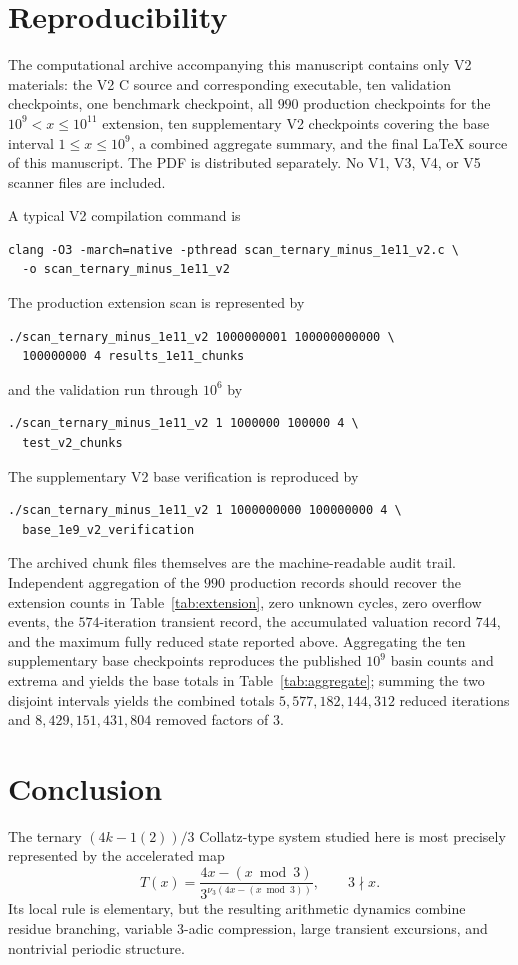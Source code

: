 \documentclass[11pt]{article}
\newcommand{\vthree}{\nu_3}
\newcommand{\Tmap}{T}
\begin{document}
\section{Reproducibility}
The computational archive accompanying this manuscript contains only V2 materials: the V2 C source and corresponding executable, ten validation checkpoints, one benchmark checkpoint, all $990$ production checkpoints for the $10^9<x\le10^{11}$ extension, ten supplementary V2 checkpoints covering the base interval $1\le x\le10^9$, a combined aggregate summary, and the final LaTeX source of this manuscript.  The PDF is distributed separately.  No V1, V3, V4, or V5 scanner files are included.

A typical V2 compilation command is
\begin{verbatim}
clang -O3 -march=native -pthread scan_ternary_minus_1e11_v2.c \
  -o scan_ternary_minus_1e11_v2
\end{verbatim}
The production extension scan is represented by
\begin{verbatim}
./scan_ternary_minus_1e11_v2 1000000001 100000000000 \
  100000000 4 results_1e11_chunks
\end{verbatim}
and the validation run through $10^6$ by
\begin{verbatim}
./scan_ternary_minus_1e11_v2 1 1000000 100000 4 \
  test_v2_chunks
\end{verbatim}
The supplementary V2 base verification is reproduced by
\begin{verbatim}
./scan_ternary_minus_1e11_v2 1 1000000000 100000000 4 \
  base_1e9_v2_verification
\end{verbatim}

The archived chunk files themselves are the machine-readable audit trail.  Independent aggregation of the $990$ production records should recover the extension counts in Table~\ref{tab:extension}, zero unknown cycles, zero overflow events, the $574$-iteration transient record, the accumulated valuation record $744$, and the maximum fully reduced state reported above.  Aggregating the ten supplementary base checkpoints reproduces the published $10^9$ basin counts and extrema and yields the base totals in Table~\ref{tab:aggregate}; summing the two disjoint intervals yields the combined totals $5,577,182,144,312$ reduced iterations and $8,429,151,431,804$ removed factors of $3$.

\section{Conclusion}
The ternary $(4k-1(2))/3$ Collatz-type system studied here is most precisely represented by the accelerated map
\[
\Tmap(x)=\frac{4x-(x\bmod3)}{3^{\vthree(4x-(x\bmod3))}},
\qquad3\nmid x.
\]
Its local rule is elementary, but the resulting arithmetic dynamics combine residue branching, variable $3$-adic compression, large transient excursions, and nontrivial periodic structure.
\end{document}

